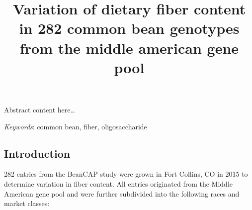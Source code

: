 \documentclass[11pt,]{article}
\title{Variation of dietary fiber content in 282 common bean genotypes from the
middle american gene pool }
\author{\Large \vspace{0.05in} \newline\normalsize\emph{}   \and \Large \vspace{0.05in} \newline\normalsize\emph{}   \and \Large \vspace{0.05in} \newline\normalsize\emph{}  }
\date{}
\newcommand*{\authorfont}{\fontfamily{phv}\selectfont}
\renewenvironment{abstract}
 {{%
    \setlength{\leftmargin}{0mm}
    \setlength{\rightmargin}{\leftmargin}%
  }%
  \relax}
 {\endlist}
\begin{document}
  


{%
\setlength{\parindent}{0pt}
\thispagestyle{plain}
{\fontsize{18}{20}\selectfont\raggedright 
\maketitle  %

}

{
   \vskip 13.5pt\relax \normalsize\fontsize{11}{12} 
\textbf{\authorfont } \hskip 15pt \emph{\small }   \par \textbf{\authorfont } \hskip 15pt \emph{\small }   \par \textbf{\authorfont } \hskip 15pt \emph{\small }  

}

}



{
\hypersetup{linkcolor=black}
\setcounter{tocdepth}{2}
\tableofcontents
}




\begin{abstract}

    \hbox{\vrule height .2pt width 39.14pc}

    \vskip 8.5pt %

\noindent Abstract content here\ldots{}


\vskip 8.5pt \noindent \emph{Keywords}: common bean, fiber, oligosaccharide \par

    \hbox{\vrule height .2pt width 39.14pc}



\end{abstract}


\vskip 6.5pt

\noindent  \subsection{Introduction}\label{introduction}

282 entries from the BeanCAP study were grown in Fort Collins, CO in
2015 to determine variation in fiber content. All entries originated
from the Middle American gene pool and were further subdivided into the
following races and market classes:
\end{document}
